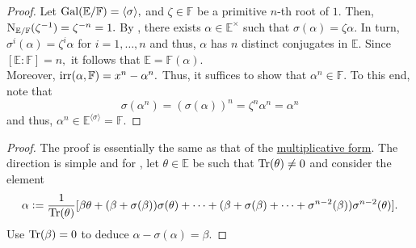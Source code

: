 \splittingfieldnthroots*\label{cor:splittingfieldnthroots2}
\begin{flushright}\hyperref[cor:splittingfieldnthroots]{\upsym}\end{flushright}
\begin{proof}
    Let $\operatorname{Gal}(\mathbb{E}/\mathbb{F}) = \langle \sigma\rangle,$ and $\zeta \in \mathbb{F}$ be a primitive $n$-th root of $1.$ Then, $\operatorname{N}_{\mathbb{E}/\mathbb{F}}(\zeta^{-1}) = \zeta^{-n} = 1.$ By , there exists $\alpha \in \mathbb{E}^\times$ such that $\sigma(\alpha) = \zeta \alpha.$ In turn, $\sigma^i(\alpha) = \zeta^i\alpha$ for $i = 1, \ldots, n$ and thus, $\alpha$ has $n$ distinct conjugates in $\mathbb{E}.$ Since $[\mathbb{E} : \mathbb{F}] = n,$ it follows that $\mathbb{E} = \mathbb{F}(\alpha).$ \\
    Moreover, $\operatorname{irr}(\alpha, \mathbb{F}) = x^n - \alpha^n.$ Thus, it suffices to show that $\alpha^n \in \mathbb{F}.$ To this end, note that 
    \begin{equation*} 
        \sigma(\alpha^n) = (\sigma(\alpha))^n = \zeta^n\alpha^n = \alpha^n
    \end{equation*}
    and thus, $\alpha^n \in \mathbb{E}^{\langle \sigma\rangle} = \mathbb{F}.$
\end{proof}

\hilbertadditive*\label{thm:hilbertadditive2}
\begin{flushright}\hyperref[thm:hilbertadditive]{\upsym}\end{flushright}
\begin{proof}
    The proof is essentially the same as that of the \hyperref[thm:hilbertmultiplicative]{multiplicative form}. The direction \backward is simple and for \forward, let $\theta \in \mathbb{E}$ be such that $\operatorname{Tr}(\theta) \neq 0$ and consider the element
    \begin{equation*} 
        \alpha \vcentcolon= \frac{1}{\operatorname{Tr}(\theta)}[\beta\theta + (\beta + \sigma(\beta))\sigma(\theta) + \cdots + (\beta + \sigma(\beta) + \cdots + \sigma^{n - 2}(\beta))\sigma^{n - 2}(\theta)].
    \end{equation*}
    Use $\operatorname{Tr}(\beta) = 0$ to deduce $\alpha - \sigma(\alpha) = \beta.$
\end{proof}

